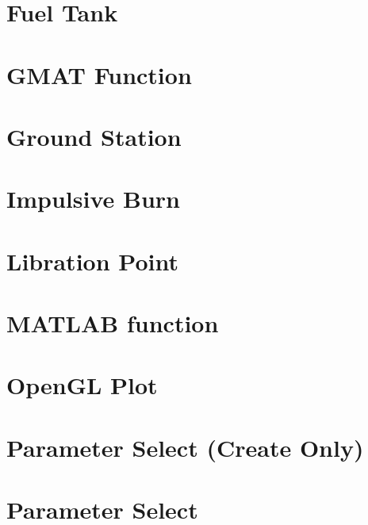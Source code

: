 \section{Fuel Tank}


\section{GMAT Function}


\section{Ground Station}


\section{Impulsive Burn}


\section{Libration Point}


\section{MATLAB function}


\section{OpenGL Plot}


\section{Parameter Select (Create Only)}


\section{Parameter Select}



